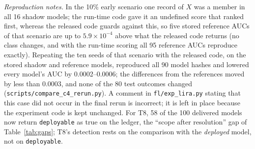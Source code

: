 \emph{Reproduction notes.} In the 10\% early scenario one record of $X$ was a member in all 16 shadow models; the run-time code gave it an undefined score that ranked first, whereas the released code guards against this, so five stored reference AUCs of that scenario are up to $5.9\times10^{-4}$ above what the released code returns (no class changes, and with the run-time scoring all 95 reference AUCs reproduce exactly). Repeating the ten seeds of that scenario with the released code, on the stored shadow and reference models, reproduced all 90 model hashes and lowered every model's AUC by 0.0002--0.0006; the differences from the references moved by less than 0.0003, and none of the 80 test outcomes changed (\texttt{scripts/compare\_c4\_rerun.py}). A comment in \texttt{fl/exp\_lira.py} stating that this case did not occur in the final rerun is incorrect; it is left in place because the experiment code is kept unchanged. For T8, 58 of the 100 delivered models now return \texttt{deployable} as true on the ledger, the ``scope after resolution'' gap of Table~\ref{tab:gaps}; T8's detection rests on the comparison with the \emph{deployed} model, not on \texttt{deployable}.


